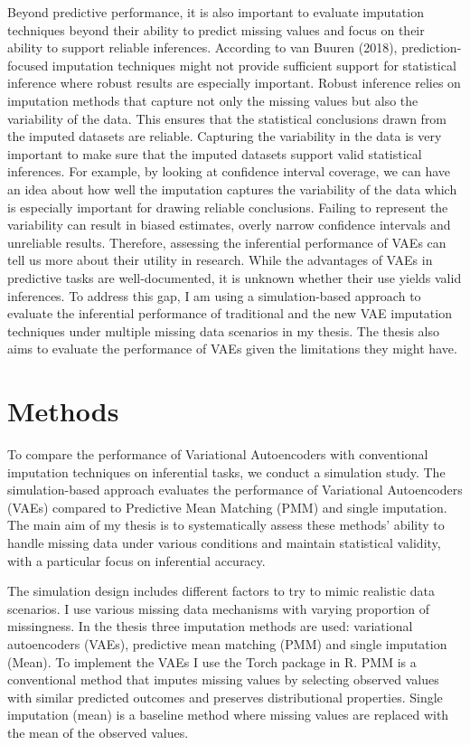 \documentclass[10pt, a4paper]{article}
\begin{document}
Beyond predictive performance, it is also important to evaluate imputation techniques beyond their ability to predict missing values and focus on their ability to support reliable inferences. According to van Buuren (2018), prediction-focused imputation techniques might not provide sufficient support for statistical inference where robust results are especially important. Robust inference relies on imputation methods that capture not only the missing values but also the variability of the data. This ensures that the statistical conclusions drawn from the imputed datasets are reliable. Capturing the variability in the data is very important to make sure that the imputed datasets support valid statistical inferences. For example, by looking at confidence interval coverage, we can have an idea about how well the imputation captures the variability of the data which is especially important for drawing reliable conclusions. Failing to represent the variability can result in biased estimates, overly narrow confidence intervals and unreliable results. Therefore, assessing the inferential performance of VAEs can tell us more about their utility in research. While the advantages of VAEs in predictive tasks are well-documented, it is unknown whether their use yields valid inferences. To address this gap, I am using a simulation-based approach to evaluate the inferential performance of traditional and the new VAE imputation techniques under multiple missing data scenarios in my thesis. The thesis also aims to evaluate the performance of VAEs given the limitations they might have. 

\section{Methods}

To compare the performance of Variational Autoencoders with conventional imputation techniques on inferential tasks, we conduct a simulation study. The simulation-based approach evaluates the performance of Variational Autoencoders (VAEs) compared to Predictive Mean Matching (PMM) and single imputation. The main aim of my thesis is to systematically assess these methods’ ability to handle missing data under various conditions and maintain statistical validity, with a particular focus on inferential accuracy. 

The simulation design includes different factors to try to mimic realistic data scenarios. I use various missing data mechanisms with varying proportion of missingness. In the thesis three imputation methods are used: variational autoencoders (VAEs), predictive mean matching (PMM) and single imputation (Mean). To implement the VAEs I use the Torch package in R. PMM is a conventional method that imputes missing values by selecting observed values with similar predicted outcomes and preserves distributional properties. Single imputation (mean) is a baseline method where missing values are replaced with the mean of the observed values. 
\end{document}
